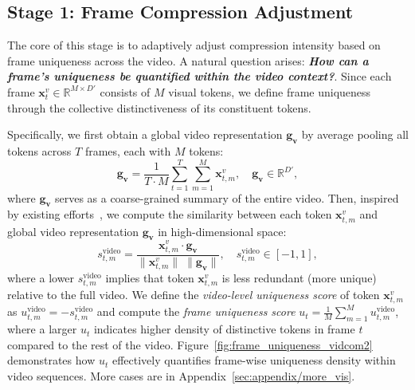 \subsection{Stage 1: Frame Compression Adjustment}


The core of this stage is to adaptively adjust compression intensity based on frame uniqueness across the video. A natural question arises: \textbf{\emph{How can a frame's uniqueness be quantified within the video context?}}. Since each frame $\mathbf{x}_t^v \in \mathbb{R}^{M \times D'}$ consists of $M$ visual tokens, we define frame uniqueness through the collective distinctiveness of its constituent tokens.


Specifically, we first obtain a global video representation $\mathbf{g_v}$ by average pooling all tokens across $T$ frames, each with $M$ tokens:
{\setlength\abovedisplayskip{2mm}
\setlength\belowdisplayskip{2mm}
\begin{equation}
\mathbf{g_v} = \frac{1}{T \cdot M} \sum_{t=1}^{T} \sum_{m=1}^{M} \mathbf{x}_{t,m}^v,\quad \mathbf{g_v}\in\mathbb{R}^{D'},
\end{equation}}
where $\mathbf{g_v}$ serves as a coarse-grained summary of the entire video. 
Then, inspired by existing efforts~\cite{sun2025mdp3}, we compute the similarity between each token $\mathbf{x}_{t,m}^v$ and global video representation $\mathbf{g_v}$ in high-dimensional space:
{\setlength\abovedisplayskip{2mm}
\setlength\belowdisplayskip{2mm}
\begin{equation}
s^\mathrm{video}_{t,m} = \frac{\mathbf{x}_{t,m}^v \cdot \mathbf{g_v}}{\|\mathbf{x}_{t,m}^v\|\;\|\mathbf{g_v}\|},\quad s^\mathrm{video}_{t,m}\in[-1,1],
\end{equation}}
where a lower $s^\mathrm{video}_{t,m}$ implies that token $\mathbf{x}_{t,m}^v$ is less redundant (more unique) relative to the full video. We define the \emph{video-level uniqueness score} of token $\mathbf{x}_{t,m}^v$ as $u^\mathrm{video}_{t,m} = -s^\mathrm{video}_{t,m}$ and compute the \emph{frame uniqueness score} $u_t = \frac{1}{M}\sum_{m=1}^{M} u^\mathrm{video}_{t,m}$, where a larger $u_t$ indicates higher density of distinctive tokens in frame $t$ compared to the rest of the video. 
Figure~\ref{fig:frame_uniqueness_vidcom2} demonstrates how $u_t$ effectively quantifies frame-wise uniqueness density within video sequences. More cases are in Appendix~\ref{sec:appendix/more_vis}.



